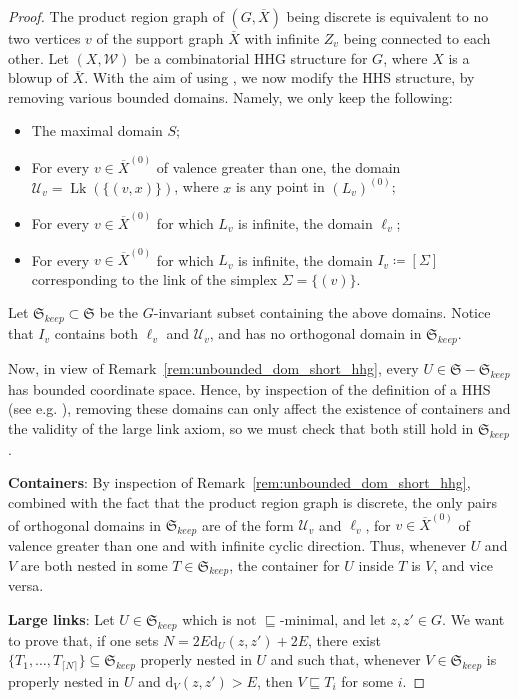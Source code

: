 \documentclass[svgnames]{amsart}
\theoremstyle{plain}
\theoremstyle{definition}
\newcommand{\frakS}{\mathfrak S}
\newcommand{\ov}[1]{\overline{#1}}
\newcommand{\U}{\mathcal{U}}
\newcommand{\dist}{\mathrm{d}}
\newcommand{\nest}{\sqsubseteq}
\newcommand{\link}{\operatorname{Lk}}
\newcommand{\W}{\mathcal{W}}
\begin{document}
\begin{proof}
    The product region graph of $(G, \ov  X)$ being discrete is equivalent to no two vertices $v$ of the support graph $\ov  X$ with infinite $Z_v$ being connected to each other. Let $(X,\W)$ be a combinatorial HHG structure for $G$, where $X$ is a blowup of $\ov X$. With the aim of using \cite[Corollary 5.2]{russell}, we now modify the HHS structure, by removing various bounded domains. Namely, we only keep the following:
    \begin{itemize}
        \item The maximal domain $S$;
        \item For every $v\in \ov X^{(0)}$ of valence greater than one, the domain $\U_v=\link(\{(v,x)\})$, where $x$ is any point in $(L_v)^{(0)}$;
        \item For every $v\in \ov X^{(0)}$ for which $L_v$ is infinite, the domain $\ell_v$;
        \item For every $v\in \ov X^{(0)}$ for which $L_v$ is infinite, the domain $I_v\coloneq[\Sigma]$ corresponding to the link of the simplex $\Sigma=\{(v)\}$.  
    \end{itemize}
    Let $\frakS_{keep}\subset \frakS$ be the $G$-invariant subset containing the above domains. Notice that $I_v$ contains both $\ell_v$ and $\U_v$, and has no orthogonal domain in $\frakS_{keep}$. 
    
    Now, in view of Remark~\ref{rem:unbounded_dom_short_hhg}, every $U\in \frakS-\frakS_{keep}$ has bounded coordinate space. Hence, by inspection of the definition of a HHS (see e.g. \cite[Definition 1.1]{HHS_II}), removing these domains can only affect the existence of containers and the validity of the large link axiom, so we must check that both still hold in $\frakS_{keep}$.
\par\medskip
    \textbf{Containers}: By inspection of Remark~\ref{rem:unbounded_dom_short_hhg}, combined with the fact that the product region graph is discrete, the only pairs of orthogonal domains in $\frakS_{keep}$ are of the form $\U_v$ and $\ell_v$, for $v\in \ov X^{(0)}$ of valence greater than one and with infinite cyclic direction. Thus, whenever $U$ and $V$ are both nested in some $T\in \frakS_{keep}$, the container for $U$ inside $T$ is $V$, and vice versa.
\par\medskip
    \textbf{Large links}: Let $U\in \frakS_{keep}$ which is not $\nest$-minimal, and let $z,z'\in G$. We want to prove that, if one sets $N=2E\dist_U(z,z')+2E$, there exist $\{T_1,\ldots, T_{\lceil N\rceil}\}\subseteq \frakS_{keep}$ properly nested in $U$ and such that, whenever $V\in \frakS_{keep}$ is properly nested in $U$ and $\dist_V(z,z')> E$, then $V\nest T_i$ for some $i$. 
    \par\medskip


\end{proof}
\end{document}
